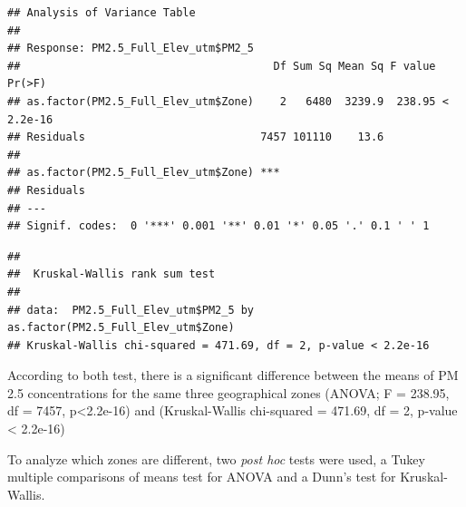 \documentclass[12pt,]{article}
\newenvironment{Shaded}{\begin{snugshade}}{\end{snugshade}}
\newcommand{\KeywordTok}[1]{\textcolor[rgb]{0.13,0.29,0.53}{\textbf{#1}}}
\newcommand{\DecValTok}[1]{\textcolor[rgb]{0.00,0.00,0.81}{#1}}
\newcommand{\StringTok}[1]{\textcolor[rgb]{0.31,0.60,0.02}{#1}}
\newcommand{\CommentTok}[1]{\textcolor[rgb]{0.56,0.35,0.01}{\textit{#1}}}
\newcommand{\OperatorTok}[1]{\textcolor[rgb]{0.81,0.36,0.00}{\textbf{#1}}}
\newcommand{\NormalTok}[1]{#1}
\begin{document}
\begin{verbatim}
## Analysis of Variance Table
## 
## Response: PM2.5_Full_Elev_utm$PM2_5
##                                       Df Sum Sq Mean Sq F value    Pr(>F)
## as.factor(PM2.5_Full_Elev_utm$Zone)    2   6480  3239.9  238.95 < 2.2e-16
## Residuals                           7457 101110    13.6                  
##                                        
## as.factor(PM2.5_Full_Elev_utm$Zone) ***
## Residuals                              
## ---
## Signif. codes:  0 '***' 0.001 '**' 0.01 '*' 0.05 '.' 0.1 ' ' 1
\end{verbatim}

\begin{Shaded}
\end{Shaded}

\begin{verbatim}
## 
##  Kruskal-Wallis rank sum test
## 
## data:  PM2.5_Full_Elev_utm$PM2_5 by as.factor(PM2.5_Full_Elev_utm$Zone)
## Kruskal-Wallis chi-squared = 471.69, df = 2, p-value < 2.2e-16
\end{verbatim}

According to both test, there is a significant difference between the
means of PM 2.5 concentrations for the same three geographical zones
(ANOVA; F = 238.95, df = 7457, p\textless{}2.2e-16) and (Kruskal-Wallis
chi-squared = 471.69, df = 2, p-value \textless{} 2.2e-16)

To analyze which zones are different, two \emph{post hoc} tests were
used, a Tukey multiple comparisons of means test for ANOVA and a Dunn's
test for Kruskal-Wallis.

\begin{Shaded}
\end{Shaded}
\end{document}
